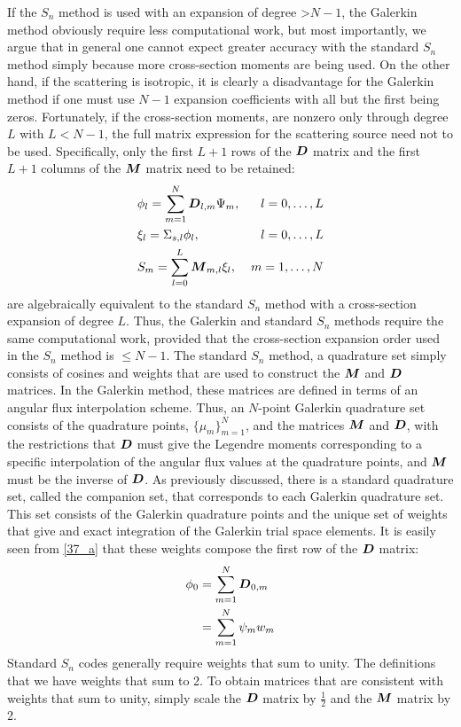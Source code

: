 If the $S_n$ method is used with an expansion of degree >$N-1$, the Galerkin
method obviously require less computational work, but most importantly, we
argue that in general one cannot expect greater accuracy with the standard
$S_n$ method simply because more cross-section moments are being used. On the
other hand, if the scattering is isotropic, it is clearly a disadvantage for
the Galerkin method if one must use $N-1$ expansion coefficients with all but
the first being zeros. Fortunately, if the cross-section moments, are nonzero
only through degree $L$ with $L<N-1$, the full matrix expression for the
scattering source need not to be used. Specifically, only the first $L+1$ rows
of the $\boldsymbol{D}$ matrix and the first $L+1$ columns of the $\boldsymbol{M}$ matrix need
to be retained:
\begin{align}
&\phi_l = \sum_{m=1}^N \bs{D}_{l,m} \Psi_m, & l=0,\hdots,L \label{40_a}\\
&\xi_l = \Sigma_{s,l}\phi_l,& l=0,\hdots,L \label{40_b}\\
&S_m = \sum_{l=0}^L \bs{M}_{m,l} \xi_l,& m=1,\hdots,N \label{40_c}
\end{align}
 are algebraically equivalent to the standard $S_n$
method with a cross-section expansion of degree $L$. Thus, the Galerkin and
standard $S_n$ methods require the same computational work, provided that the
cross-section expansion order used in the $S_n$ method is $\leq N-1$. The
standard $S_n$ method, a quadrature set simply consists of cosines and weights
that are used to construct the $\boldsymbol{M}$ and $\boldsymbol{D}$ matrices. In the Galerkin
method, these matrices are defined in terms of an angular flux interpolation
scheme. Thus, an $N$-point Galerkin quadrature set consists of the quadrature
points, $\{\mu_m\}_{m=1}^N$, and the matrices $\boldsymbol{M}$ and $\boldsymbol{D}$, with the
restrictions that $\boldsymbol{D}$ must give the Legendre moments corresponding to a
specific interpolation of the angular flux values at the quadrature points, and
$\boldsymbol{M}$ must be the inverse of $\boldsymbol{D}$. As previously discussed, there is a
standard quadrature set, called the companion set, that corresponds to each
Galerkin quadrature set. This set consists of the Galerkin quadrature points
and the unique set of weights that give and exact integration of the Galerkin
trial space elements. It is easily seen from \cref{37_a} that these weights
compose the first row of the $\boldsymbol{D}$ matrix:
\begin{equation}
\begin{split}
\phi_0 &= \sum_{m=1}^N \boldsymbol{D}_{0,m}\\
&=\sum_{m=1}^N \psi_m w_m
\end{split}
\end{equation}
Standard $S_n$ codes generally require weights that sum to unity. The
definitions that we have weights that sum to 2. To obtain matrices that are
consistent with weights that sum to unity, simply scale the $\boldsymbol{D}$ matrix by
$\frac{1}{2}$ and the $\boldsymbol{M}$ matrix by 2.

